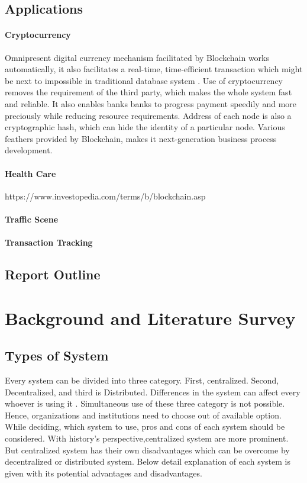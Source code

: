 \documentclass[a4paper,twoside,12pt]{report}
\begin{document}
\begin{spacing}{1.5}
\section{Applications}
\subsubsection{Cryptocurrency}
Omnipresent digital currency mechanism facilitated by Blockchain works automatically, it also facilitates a real-time, time-efficient transaction which might be next to impossible in traditional database system \cite{overviewofblockchainsecurity,democraticmininginbitcoins}. Use of cryptocurrency removes the requirement of the third party, which makes the whole system fast and reliable. It also enables banks banks to progress payment speedily and more preciously while reducing resource requirements.
Address of each node is also a cryptographic hash, which can hide the identity of a particular node.  Various feathers provided by Blockchain, makes it next-generation business process development.
\subsubsection{Health Care}
https://www.investopedia.com/terms/b/blockchain.asp
\subsubsection{Traffic Scene}
\subsubsection{Transaction Tracking}
\section{Report Outline}
\chapter{Background and Literature Survey}
\section{Types of System}
Every system can be divided into three category. First, centralized. Second, Decentralized, and third is Distributed. Differences in the system can affect every whoever is using it \cite{gfg_cent_vs_decent}. Simultaneous use of these three category is not possible. Hence, organizations and institutions need to choose out of available option. While deciding, which system to use, pros and cons of each system should be considered. With history's perspective,centralized system are more prominent. But centralized system has their own disadvantages which can be overcome by decentralized or distributed system. Below detail explanation of each system is given with its potential advantages and disadvantages.

\end{spacing}
\end{document}
